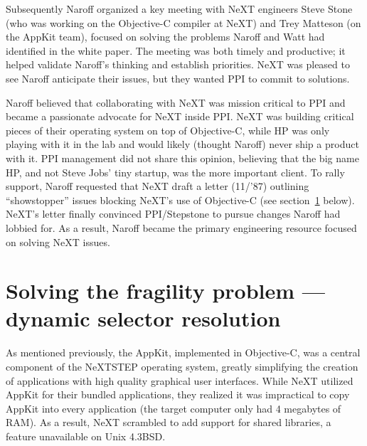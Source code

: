 \documentclass[acmsmall,screen]{acmart}
\begin{document}
Subsequently Naroff organized a key meeting with NeXT engineers Steve Stone (who was working on the Objective-C compiler at NeXT) and Trey Matteson (on the AppKit team), focused on solving the problems Naroff and Watt had identified in the white paper. The meeting was both timely and productive; it helped validate Naroff's thinking and establish priorities. NeXT was pleased to see Naroff anticipate their issues, but they wanted PPI to commit to solutions.

Naroff believed that collaborating with NeXT was mission critical to PPI and became a passionate advocate for NeXT inside PPI. NeXT was building critical pieces of their operating system on top of Objective-C, while HP was only playing with it in the lab and would likely (thought Naroff) never ship a product with it. PPI management did not share this opinion, believing that the big name HP, and not Steve Jobs' tiny startup, was the more important client. To rally support, Naroff requested that NeXT draft a letter (11/'87) outlining ``showstopper'' issues blocking NeXT's use of Objective-C (see section~\ref{sec-solvingfragility} below). NeXT's letter finally convinced PPI/Stepstone to pursue changes Naroff had lobbied for. As a result, Naroff became the primary engineering resource focused on solving NeXT issues.
\section{Solving the fragility problem --- dynamic selector resolution}
\label{sec-solvingfragility}
As mentioned previously, the AppKit, implemented in Objective-C, was a central component of the NeXTSTEP operating system, greatly simplifying the creation of applications with high quality graphical user interfaces. While NeXT utilized AppKit for their bundled applications, they realized it was impractical to copy AppKit into every application (the target computer only had 4 megabytes of RAM). As a result, NeXT scrambled to add support for shared libraries, a feature unavailable on Unix 4.3BSD. 
\end{document}
